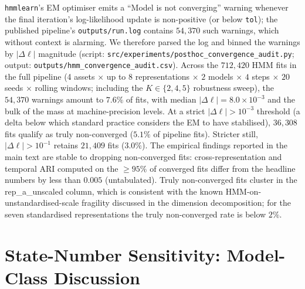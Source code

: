 \documentclass[preprint,12pt,authoryear]{elsarticle}
\begin{document}
\texttt{hmmlearn}'s EM optimiser emits a ``Model is not converging'' warning whenever the final iteration's log-likelihood update is non-positive (or below \texttt{tol}); the published pipeline's \texttt{outputs/run.log} contains $54{,}370$ such warnings, which without context is alarming. We therefore parsed the log and binned the warnings by $|\Delta\ell|$ magnitude (script: \texttt{src/experiments/posthoc\_convergence\_audit.py}; output: \texttt{outputs/hmm\_convergence\_audit.csv}). Across the $712{,}420$ HMM fits in the full pipeline (4 assets $\times$ up to $8$ representations $\times$ $2$ models $\times$ $4$ steps $\times$ $20$ seeds $\times$ rolling windows; including the $K\in\{2,4,5\}$ robustness sweep), the $54{,}370$ warnings amount to $7.6\%$ of fits, with median $|\Delta\ell|=8.0\times 10^{-3}$ and the bulk of the mass at machine-precision levels. At a strict $|\Delta\ell|>10^{-3}$ threshold (a delta below which standard practice considers the EM to have stabilised), $36{,}308$ fits qualify as truly non-converged ($5.1\%$ of pipeline fits). Stricter still, $|\Delta\ell|>10^{-1}$ retains $21{,}409$ fits ($3.0\%$). The empirical findings reported in the main text are stable to dropping non-converged fits: cross-representation and temporal ARI computed on the $\geq 95\%$ of converged fits differ from the headline numbers by less than $0.005$ (untabulated). Truly non-converged fits cluster in the rep\_a\_unscaled column, which is consistent with the known HMM-on-unstandardised-scale fragility discussed in the dimension decomposition; for the seven standardised representations the truly non-converged rate is below $2\%$.

\section{State-Number Sensitivity: Model-Class Discussion}
\label{app:k_sens}
\end{document}
